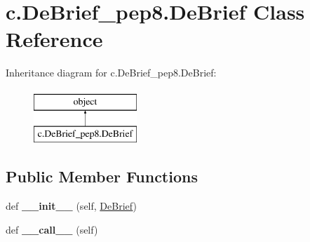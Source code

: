 \hypertarget{classc_1_1_de_brief__pep8_1_1_de_brief}{}\section{c.\+De\+Brief\+\_\+pep8.\+De\+Brief Class Reference}
\label{classc_1_1_de_brief__pep8_1_1_de_brief}
Inheritance diagram for c.\+De\+Brief\+\_\+pep8.\+De\+Brief\+:\begin{figure}[H]
\begin{center}
\leavevmode
\includegraphics[height=2.000000cm]{classc_1_1_de_brief__pep8_1_1_de_brief}
\end{center}
\end{figure}
\subsection*{Public Member Functions}
\begin{DoxyCompactItemize}
\item 
\hypertarget{classc_1_1_de_brief__pep8_1_1_de_brief_aaf25bdf2101f7addc15f6aa5dbb75e75}{}def {\bfseries \+\_\+\+\_\+init\+\_\+\+\_\+} (self, \hyperlink{classc_1_1_de_brief__pep8_1_1_de_brief}{De\+Brief})\label{classc_1_1_de_brief__pep8_1_1_de_brief_aaf25bdf2101f7addc15f6aa5dbb75e75}

\item 
\hypertarget{classc_1_1_de_brief__pep8_1_1_de_brief_a0540e8b1be9cdac5a672312946e369cf}{}def {\bfseries \+\_\+\+\_\+call\+\_\+\+\_\+} (self)\label{classc_1_1_de_brief__pep8_1_1_de_brief_a0540e8b1be9cdac5a672312946e369cf}

\end{DoxyCompactItemize}
